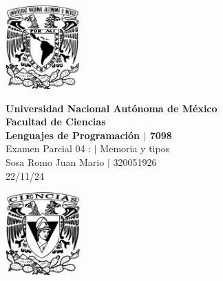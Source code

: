 \begin{center}
    \begin{minipage}{3cm}
    	\begin{center}
    		\includegraphics[height=3.2cm]{src/Img/Logo_UNAM.png}
    	\end{center}
    \end{minipage}\hfill
    \begin{minipage}{10cm}
    	\begin{center}
    	\textbf{\large Universidad Nacional Autónoma de México}\\[0.1cm]
        \textbf{Facultad de Ciencias}\\[0.1cm]
        \textbf{Lenguajes de Programación  $|$ 7098}\\[0.1cm]
        Examen Parcial 04 : $|$ Memoria y tipos \\[0.1cm]
        Sosa Romo Juan Mario $|$ 320051926 \\[0.1cm]
        22/11/24
    	\end{center}
    \end{minipage}\hfill
    \begin{minipage}{3cm}
    	\begin{center}
    		\includegraphics[height=3.2cm]{src/Img/Logo_FC.png}
    	\end{center}
    \end{minipage}
\end{center}

